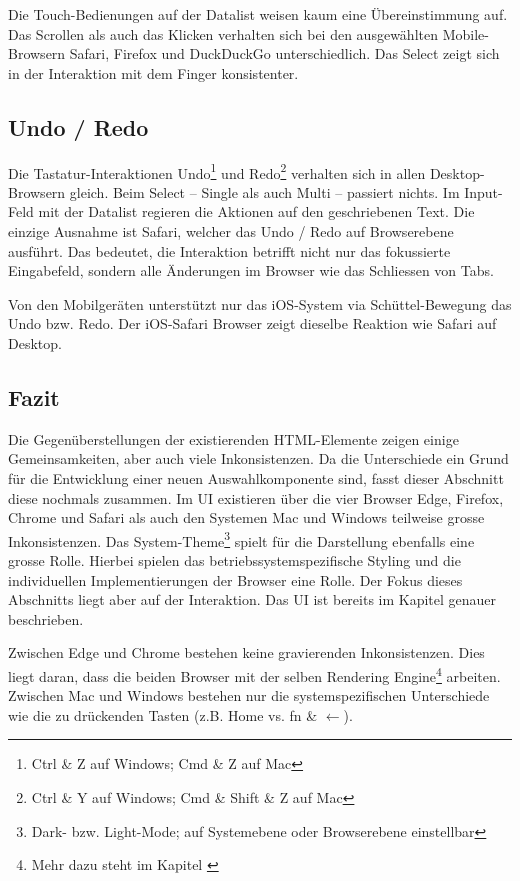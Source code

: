 Die Touch-Bedienungen auf der Datalist weisen kaum eine Übereinstimmung auf. 
Das Scrollen als auch das Klicken verhalten sich bei den ausgewählten Mobile-Browsern Safari, Firefox und DuckDuckGo unterschiedlich. 
Das Select zeigt sich in der Interaktion mit dem Finger konsistenter. 


\subsection{Undo / Redo}
\label{sec:undoRedo}

Die Tastatur-Interaktionen Undo\footnote{
    Ctrl \& Z auf Windows; Cmd \& Z auf Mac
} und Redo\footnote{
    Ctrl \& Y auf Windows; Cmd \& Shift \& Z auf Mac
} verhalten sich in allen Desktop-Browsern gleich. 
Beim Select – Single als auch Multi – passiert nichts. 
Im Input-Feld mit der Datalist regieren die Aktionen auf den geschriebenen Text. 
Die einzige Ausnahme ist Safari, welcher das Undo / Redo auf Browserebene ausführt. 
Das bedeutet, die Interaktion betrifft nicht nur das fokussierte Eingabefeld, sondern alle Änderungen im Browser wie das Schliessen von Tabs. 

Von den Mobilgeräten unterstützt nur das iOS-System via Schüttel-Bewegung das Undo bzw. Redo. 
Der iOS-Safari Browser zeigt dieselbe Reaktion wie Safari auf Desktop. 


\clearpage
\subsection{Fazit}
\label{sec:summeryExisting}

Die Gegenüberstellungen der existierenden HTML-Elemente zeigen einige Gemeinsamkeiten, aber auch viele Inkonsistenzen. 
Da die Unterschiede ein Grund für die Entwicklung einer neuen Auswahlkomponente sind, fasst dieser Abschnitt diese nochmals zusammen. 
Im UI existieren über die vier Browser Edge, Firefox, Chrome und Safari als auch den Systemen Mac und Windows teilweise grosse Inkonsistenzen. 
Das System-Theme\footnote{
    Dark- bzw. Light-Mode; auf Systemebene oder Browserebene einstellbar
} spielt für die Darstellung ebenfalls eine grosse Rolle. 
Hierbei spielen das betriebssystemspezifische Styling und die individuellen Implementierungen der Browser eine Rolle. 
Der Fokus dieses Abschnitts liegt aber auf der Interaktion. 
Das UI ist bereits im Kapitel \textbf{} genauer beschrieben. 

Zwischen Edge und Chrome bestehen keine gravierenden Inkonsistenzen. 
Dies liegt daran, dass die beiden Browser mit der selben Rendering Engine\footnote{
    Mehr dazu steht im Kapitel \textbf{}
} arbeiten. 
Zwischen Mac und Windows bestehen nur die systemspezifischen Unterschiede wie die zu drückenden Tasten (z.B. Home vs. fn \& $\leftarrow$). 

